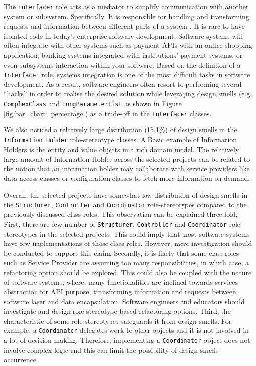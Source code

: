 \documentclass[AMA,Times1COL]{WileyNJDv5} %
\begin{document}
	The {\tt Interfacer} role acts as a mediator to simplify communication with another system or subsystem. Specifically, It is responsible for handling and transforming requests and information between different parts of a system \cite{wirfs2006characterizing}. It is rare to have isolated code in today's enterprise software development. Software systems will often integrate with other systems such as payment APIs with an online shopping application, banking systems integrated with institutions' payment systems, or even subsystems interaction within your software. Based on the definition of a {\tt Interfacer} role, systems integration is one of the most difficult tasks in software development. As a result, software engineers often resort to performing several ``hacks'' in order to realise the desired solution while leveraging design smells (e.g. {\tt ComplexClass} and {\tt LongParameterList} as shown in Figure \ref{fig:bar_chart_percentage}) as a trade-off in the {\tt Interfacer} classes.
	
	We also noticed a relatively large distribution (15.1\%) of design smells in the {\tt Information Holder} role-stereotype classes. A Basic example of Information Holders is the entity and value objects in a rich domain model. The relatively large amount of Information Holder across the selected projects can be related to the notion that an information holder may collaborate with service providers like data access classes or configuration classes to fetch more information on demand. 
	
	Overall, the selected projects have somewhat low distribution of design smells in the {\tt Structurer}, {\tt Controller} and {\tt Coordinator} role-stereotypes compared to the previously discussed class roles. This observation can be explained three-fold;
	First, there are few number of {\tt Structurer}, {\tt Controller} and {\tt Coordinator} role-stereotypes in the selected projects. This could imply that most software systems have few implementations of those class roles. However, more investigation should be conducted to support this claim. Secondly, it is likely that some class roles such as Service Provider are assuming too many responsibilities, in which case, a refactoring option should be explored. This could also be coupled with the nature of software systems, where, many functionalities are inclined towards services abstraction for API purpose,  transforming information and requests between software layer and data encapsulation. Software engineers and educators should investigate and design role-stereotype based refactoring options. Third, the characteristic of some role-stereotypes safeguards it from design smells. For example, a {\tt Coordinator} delegates work to other objects and it is not involved in a lot of decision making. Therefore, implementing a {\tt Coordinator} object does not involve complex logic and this can limit the possibility of design smells occurrence.
	
\end{document}

